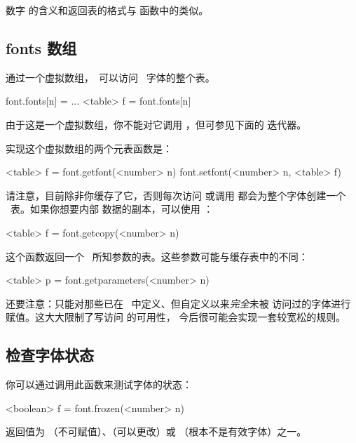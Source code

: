 数字  的含义和返回表的格式与  函数中的类似。

\subsection{fonts 数组}


通过一个虚拟数组，\LUA\ 可以访问 \TEX\ 字体的整个表。

\begin{typing}
font.fonts[n] = { ... }
<table> f = font.fonts[n]
\end{typing}

由于这是一个虚拟数组，你不能对它调用 ，但可参见下面的
 迭代器。

实现这个虚拟数组的两个元表函数是：

\begin{typing}
<table> f = font.getfont(<number> n)
font.setfont(<number> n, <table> f)
\end{typing}

请注意，目前除非你缓存了它，否则每次访问  或调用
 都会为整个字体创建一个 \LUA\ 表。如果你想要内部
数据的副本，可以使用 ：

\begin{typing}
<table> f = font.getcopy(<number> n)
\end{typing}

这个函数返回一个 \TEX\ 所知参数的表。这些参数可能与缓存表中的不同：

\begin{typing}
<table> p = font.getparameters(<number> n)
\end{typing}

还要注意：只能对那些已在 \TEX\ 中定义、但自定义以来{\it 完全\/}未被
访问过的字体进行赋值。这大大限制了写访问  的可用性，
今后很可能会实现一套较宽松的规则。

\subsection{检查字体状态}

你可以通过调用此函数来测试字体的状态：

\begin{typing}
<boolean> f =
    font.frozen(<number> n)
\end{typing}

返回值为 （不可赋值）、（可以更改）或
（根本不是有效字体）之一。

